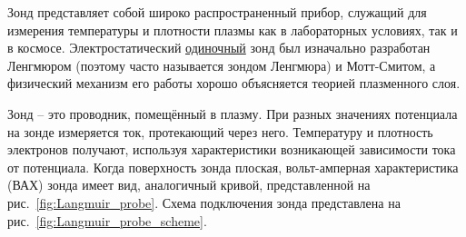 \documentclass[10pt, a4paper]{article}
\begin{document}
Зонд представляет собой широко распространенный прибор, 
служащий для измерения температуры и плотности плазмы как в 
лабораторных условиях, так и в космосе. Электростатический \uline{одиночный} зонд был изначально разработан Ленгмюром (поэтому часто называется зондом Ленгмюра) и Мотт-Смитом, а физический механизм его работы хорошо объясняется теорией плазменного слоя. 

Зонд -- это проводник, помещённый в плазму. При разных значениях потенциала на зонде измеряется ток, протекающий через него. Температуру и плотность электронов получают, используя характеристики возникающей зависимости тока от потенциала. Когда поверхность зонда плоская, вольт-амперная характеристика (ВАХ) зонда имеет вид, аналогичный кривой, представленной на рис.~\ref{fig:Langmuir_probe}. Схема подключения зонда представлена на рис.~\ref{fig:Langmuir_probe_scheme}.
\end{document}
